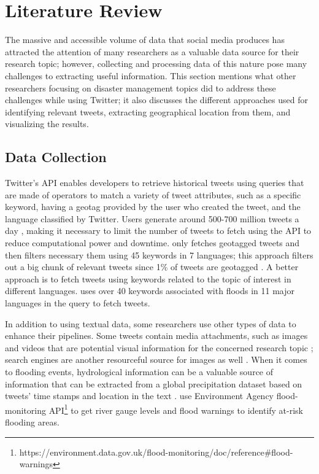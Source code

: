 \chapter{Literature Review}

The massive and accessible volume of data that social media produces has attracted the attention of
many researchers as a valuable data source for their research topic; however, collecting and
processing data of this nature pose many challenges to extracting useful information. This section
mentions what other researchers focusing on disaster management topics did to address these
challenges while using Twitter; it also discusses the different approaches used for identifying
relevant tweets, extracting geographical location from them, and visualizing the results.

\section{Data Collection} 

Twitter's \ac{API} enables developers to retrieve historical tweets using
queries that are made of operators to match a variety of tweet attributes, such as a specific
keyword, having a geotag provided by the user who created the tweet, and the language classified by
Twitter. Users generate around 500-700 million tweets a day \cite{inproceedings}, making it
necessary to limit the number of tweets to fetch using the \ac{API} to reduce computational power and
downtime.  only fetches geotagged tweets and then filters
necessary
them using 45 keywords in 7 languages; this approach filters out a big chunk of relevant tweets
since 1\% of tweets are geotagged \cite{middletonRealTimeCrisisMapping2014}. A better approach is to
fetch tweets using keywords related to the topic of interest in different languages.
 uses over 40 keywords associated with floods in 11
major languages in the query to fetch tweets.

In addition to using textual data, some researchers use other types of data to enhance their
pipelines. Some tweets contain media attachments, such as images and videos that are potential
visual information for the concerned research topic
\cite{alamFloodDetectionTwitter2020}\cite{saidFloodsDetectionTwitter2020}\cite{ningPrototypingSocialMedia2020};
search engines are another resourceful source for images as well
\cite{fengExtractionPluvialFlood2018}. When it comes to flooding events, hydrological information
can be a valuable source of information that can be extracted from a global precipitation dataset
based on tweets' time stamps and location in the text
\cite{debruijnImprovingClassificationFlood2020}.
 use Environment Agency flood-monitoring
\ac{API}\footnote{https://environment.data.gov.uk/flood-monitoring/doc/reference\#flood-warnings} to
get river gauge levels and flood warnings to identify at-risk flooding areas.

